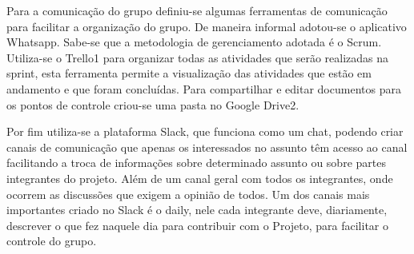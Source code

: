 	Para a comunicação do grupo definiu-se algumas ferramentas de comunicação para facilitar a organização do grupo. De maneira informal adotou-se o aplicativo Whatsapp. Sabe-se que a metodologia de gerenciamento adotada é o Scrum. Utiliza-se o Trello1 para organizar todas as atividades que serão realizadas na sprint, esta ferramenta permite a visualização das atividades que estão em andamento e que foram concluídas. Para compartilhar e editar documentos para os pontos de controle criou-se uma pasta no Google Drive2.
	
	Por fim utiliza-se a plataforma Slack, que funciona como um chat, podendo criar canais de comunicação que apenas os interessados no assunto têm acesso ao canal facilitando a troca de informações sobre determinado assunto ou sobre partes integrantes do projeto. Além de um canal geral com todos os integrantes, onde ocorrem as discussões que exigem a opinião de todos. Um dos canais mais importantes criado no Slack é o daily, nele cada integrante deve, diariamente, descrever o que fez naquele dia para contribuir com o Projeto, para facilitar o controle do grupo.

